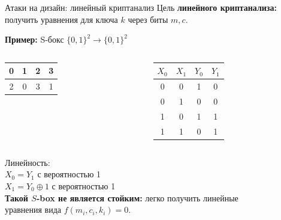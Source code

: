 \documentclass[usenames,dvipsnames,8pt,aspectratio=169]{beamer}
\begin{document}
\begin{frame}{Атаки на дизайн: линейный криптанализ }
\LARGE
	Цель {\color{Orange}\textbf{линейного криптанализа:}} получить уравнения для ключа $k$ через биты $m, c$.
	
	{\color{Orange}\textbf{Пример:}} S-бокс $\{0,1\}^2 \rightarrow \{0,1\}^2$
	\begin{columns}
	\begin{column}{0.4\textwidth}
		\begin{tabular}{c | c | c | c}
			0 & 1 & 2 & 3 \\ \hline
			2 & 0 & 3 & 1
		\end{tabular}
	\end{column}
	\begin{column}{0.5\textwidth}
		\begin{tabular}{c | c | c | c}
			$X_0$ & $X_1$ & $Y_0$ & $Y_1$ \\ \hline
			0 & 0 & 1 & 0 \\
			0 & 1 & 0 & 0 \\
			1 & 0 & 1 & 1 \\
			1 & 1 & 0 & 1 
		\end{tabular}
	\end{column}
	\end{columns}
	
	Линейность: \\
	$X_0 = Y_1$ с вероятностью 1\\
	$X_1 = Y_0 \oplus 1$  с вероятностью 1\\[10pt]
	
	{\color{Orange}\textbf{Такой $S$-box не является стойким:}} легко получить линейные \\ уравнения вида $f(m_i, c_i, k_i) = 0$.
	
\end{frame}
\end{document}
